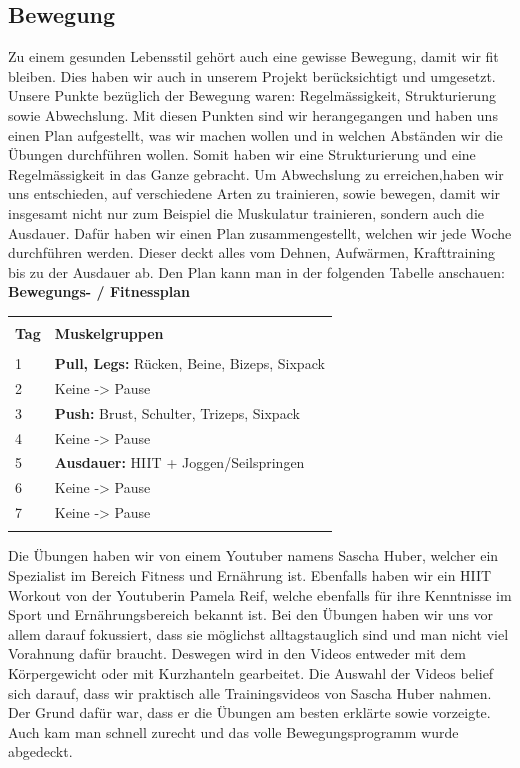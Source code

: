 \subsection{Bewegung}
\authortoc{\bastian}{\subsectionident}
Zu einem gesunden Lebensstil gehört auch eine gewisse Bewegung, damit wir fit bleiben. Dies haben wir auch in unserem Projekt berücksichtigt und umgesetzt. Unsere Punkte bezüglich der Bewegung waren: Regelmässigkeit, Strukturierung sowie Abwechslung. Mit diesen Punkten sind wir herangegangen und haben uns einen Plan aufgestellt, was wir machen wollen und in welchen Abständen wir die Übungen durchführen wollen. Somit haben wir eine Strukturierung und eine Regelmässigkeit in das Ganze gebracht. Um Abwechslung zu erreichen,haben wir uns entschieden, auf verschiedene Arten zu trainieren, sowie bewegen, damit wir insgesamt nicht nur zum Beispiel die Muskulatur trainieren, sondern auch die Ausdauer. Dafür haben wir einen Plan zusammengestellt, welchen wir jede Woche durchführen werden. Dieser deckt alles vom Dehnen, Aufwärmen, Krafttraining bis zu der Ausdauer ab. Den Plan kann man in der folgenden Tabelle anschauen:
\newline
\newline
\textbf{Bewegungs- / Fitnessplan}
\newline
\begin{table}[htp]
  \begin{tabularx}{\textwidth}{l X}\hline \\
    \textbf{Tag} & \textbf{Muskelgruppen}  \\\hline \\
    1 & \textbf{Pull, Legs:} Rücken, Beine, Bizeps, Sixpack \\
    2 & Keine -> Pause \\
    3 & \textbf{Push:} Brust, Schulter, Trizeps, Sixpack \\
    4 & Keine -> Pause \\
    5 & \textbf{Ausdauer:} HIIT + Joggen/Seilspringen \\
    6 & Keine -> Pause \\
    7 & Keine -> Pause \\
    \\\hline
  \end{tabularx}
\end{table}
\newline
Die Übungen haben wir von einem Youtuber namens Sascha Huber, welcher ein Spezialist im Bereich Fitness und Ernährung ist. Ebenfalls haben wir ein HIIT Workout von der Youtuberin Pamela Reif, welche ebenfalls für ihre Kenntnisse im Sport und Ernährungsbereich bekannt ist. Bei den Übungen haben wir uns vor allem darauf fokussiert, dass sie möglichst alltagstauglich sind und man nicht viel Vorahnung dafür braucht. Deswegen wird in den Videos entweder mit dem Körpergewicht oder mit Kurzhanteln gearbeitet. Die Auswahl der Videos belief sich darauf, dass wir praktisch alle Trainingsvideos von Sascha Huber nahmen. Der Grund dafür war, dass er die Übungen am besten erklärte sowie vorzeigte. Auch kam man schnell zurecht und das volle Bewegungsprogramm wurde abgedeckt.

